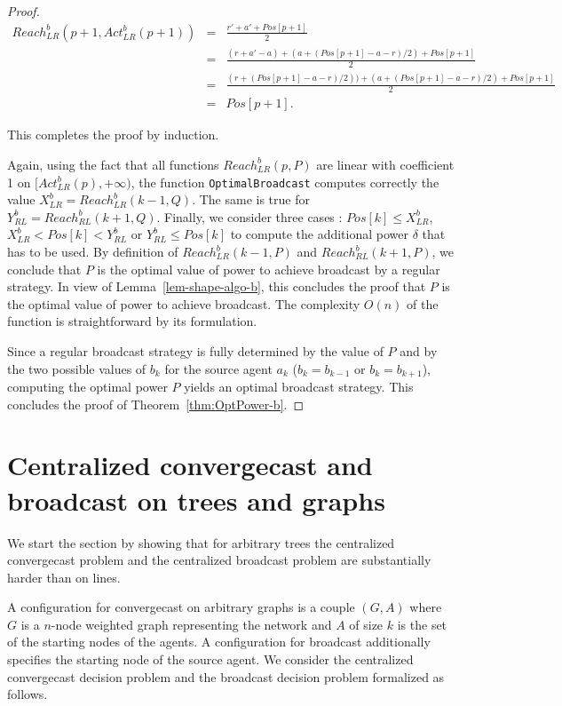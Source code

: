 \documentclass{article}
\newcommand\X{X_{LR}^b\xspace}
\newcommand\Y{Y_{RL}^b\xspace}
\newcommand\rblr{Reach_{LR}^b\xspace}
\newcommand\rbrl{Reach_{RL}^b\xspace}
\newcommand\ablr{Act_{LR}^b\xspace}
\newcommand\Optbc{\mbox{{\tt OptimalBroadcast}}\xspace}
\newcommand\ccast{convergecast\xspace}
\newcommand\cccast{centralized convergecast\xspace}
\newcommand\Cccast{Centralized convergecast\xspace}
\begin{document}
\begin{proof}
\begin{eqnarray*}
\rblr(p+1,\ablr(p+1)) & = & \frac{r' + a' + Pos[p+1]}{2}\\
& = & \frac{(r+a'-a) +(a+(Pos[p+1]-a-r)/2) + Pos[p+1]}{2}\\
& = & \frac{(r+(Pos[p+1]-a-r)/2)) +(a+(Pos[p+1]-a-r)/2) + Pos[p+1]}{2}\\
& = & Pos[p+1].
\end{eqnarray*}

This completes the proof by induction.

Again, using the fact that all functions $\rblr(p,P)$ are linear with coefficient 1 on $[\ablr(p),+\infty)$, the function \Optbc computes correctly the value $\X=\rblr(k-1,Q)$. The same is true for $\Y=\rbrl(k+1,Q)$. Finally, we consider three cases : $Pos[k] \le \X$, $\X < Pos[k] < \Y$ or $\Y \le Pos[k]$ to compute the additional power $\delta$ that has to be used.
By definition of $\rblr(k-1,P)$ and $\rbrl(k+1,P)$, we conclude that $P$ is the optimal value of power to achieve broadcast by a regular strategy. In view of Lemma~\ref{lem-shape-algo-b}, this concludes the proof that $P$ is the optimal value of power to achieve broadcast. The complexity $O(n)$ of the function is straightforward by its formulation. 

Since a regular broadcast strategy is fully determined by the value of $P$ and by 
the two possible values of $b_k$ for the source agent $a_k$ ($b_k=b_{k-1}$ or $b_k=b_{k+1}$), computing the optimal power $P$ yields an optimal broadcast strategy. This concludes the proof of Theorem~\ref{thm:OptPower-b}.
\end{proof}




\section{{\Cccast} and broadcast on trees  and graphs}\label{s:tree}

We start the section by showing that for arbitrary trees the {\cccast} problem and the centralized  broadcast problem are substantially harder than on lines.

A configuration for {\ccast} on arbitrary graphs is a couple $(G,A)$ where $G$ is a $n$-node weighted graph representing the network and $A$ of size $k$ is the set of the starting nodes of the agents. A configuration for broadcast additionally specifies the starting node of the source agent. 
We consider the {\cccast} decision problem and the broadcast decision problem formalized as follows. 
\end{document}
